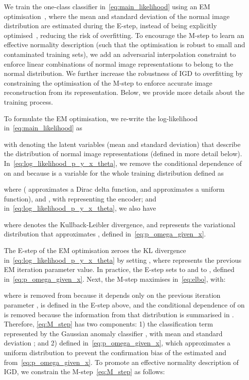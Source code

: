 \documentclass[letterpaper]{article} \usepackage{aaai22}  \usepackage{times}  \usepackage{helvet}  \usepackage{courier}  \usepackage[hyphens]{url}  \usepackage{graphicx} \urlstyle{rm} \def\UrlFont{\rm}  \usepackage{natbib}  \usepackage{caption} \DeclareCaptionStyle{ruled}{labelfont=normalfont,labelsep=colon,strut=off} \frenchspacing  \setlength{\pdfpagewidth}{8.5in}  \setlength{\pdfpageheight}{11in}  \usepackage{algorithm}
\begin{document}
We train the one-class classifier in~\eqref{eq:main_likelihood} using an
EM optimisation~\citep{dempster1977maximum}, where the mean and standard deviation of the normal image distribution are estimated during the E-step, instead of being explicitly optimised~\cite{dsvdd}, reducing the risk of overfitting.
To encourage the M-step to learn an effective normality description (such that the optimisation is robust to small and contaminated training sets), we add an adversarial interpolation constraint to enforce linear combinations of normal image representations to belong to the normal distribution. 
We further increase the robustness of IGD to overfitting by constraining the optimisation of the M-step to enforce accurate image reconstruction from its representation.
Below, we provide more details about the training process.



To formulate the EM optimisation, we re-write the log-likelihood in~\eqref{eq:main_likelihood} as

with  denoting the latent variables (mean and standard deviation) that describe the distribution of normal image representations (defined in more detail below).
In~\eqref{eq:log_likelihood_p_y_x_theta}, we remove the conditional dependence of  on  and  because
 is a variable for the whole training distribution defined as

where  ( approximates a Dirac delta function, and  approximates a uniform function),  and 
,
with  representing the  encoder; and in~\eqref{eq:log_likelihood_p_y_x_theta}, we also have

 where 
  denotes the Kullback-Leibler divergence, and  represents the variational distribution that approximates , defined in~\eqref{eq:p_omega_given_x}.


The E-step of the EM optimisation zeroes the KL divergence in~\eqref{eq:log_likelihood_p_y_x_theta} by setting 
, where  represents the previous EM iteration parameter value. In practice, the E-step sets  to  and  to , defined in~\eqref{eq:p_omega_given_x}.
Next, the M-step maximises  in~\eqref{eq:elbo}, with:

where  is removed from  because it depends only on the previous iteration parameter ,
 is defined in the E-step above, and 
the conditional dependence of  on  is removed because the information from that distribution is summarised in .  Therefore, \eqref{eq:M_step} has two components: 1) the classification term represented by the Gaussian anomaly classifier , with mean  and standard deviation ; and 2)  defined in~\eqref{eq:p_omega_given_x}, 
which approximates a uniform distribution to prevent the confirmation bias of the estimated  and  from~\eqref{eq:p_omega_given_x}.
To promote an effective normality description of IGD, we constrain the M-step~\eqref{eq:M_step} as follows:
\end{document}

